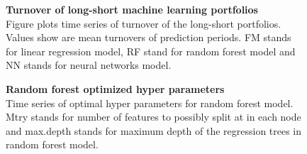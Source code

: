 \documentclass{article}
\begin{document}
\begin{figure}[ht]
\centering
\caption[Turnover of long-short machine learning portfolios]{\textbf{Turnover of long-short machine learning portfolios}\\ Figure plots time series of turnover of the long-short portfolios. Values show are mean turnovers of prediction periods. FM stands for linear regression model, RF stand for random forest model and NN stands for neural networks model. }

\label{plot:Turnover}
\end{figure}

\begin{figure}[ht]
\centering
\caption[Optimized random forest hyperparameters]{\textbf{Random forest optimized hyper parameters}\\ Time series of optimal hyper parameters for random forest model. Mtry stands for number of features to possibly split at in each node and max.depth stands for maximum depth of the regression trees in random forest model.}

\label{plot:RFHyperParams}
\end{figure}

\clearpage


\end{document}
